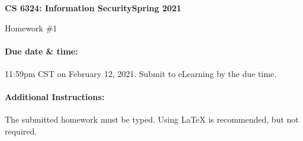 \documentclass[11pt]{article}
\begin{document}
\thispagestyle{empty}

\noindent \textbf{CS 6324: Information Security\hspace*{\fill}Spring 2021}
\begin{center}
{\LARGE Homework \#1}
\end{center}

\paragraph{Due date \& time:} 11:59pm CST on February 12, 2021.
Submit to eLearning by the due time.


\vspace*{-0.1in}\paragraph{Additional Instructions:} The submitted homework must be typed. Using \LaTeX{} is recommended, but not required.
\\
\end{document}
